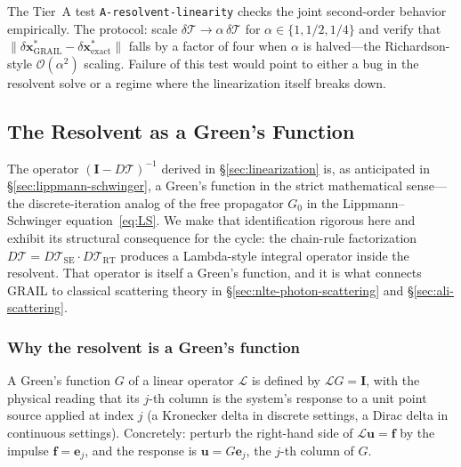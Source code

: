 \documentclass[11pt]{article}
\newcommand{\Tcyc}{\mathcal{T}}
\newcommand{\Trt}{\Tcyc_{\mathrm{RT}}}
\newcommand{\Tse}{\Tcyc_{\mathrm{SE}}}
\newcommand{\dT}{\delta\Tcyc}
\begin{document}
The Tier~A test \texttt{A-resolvent-linearity} checks the joint
second-order behavior empirically.  The protocol: scale $\dT \to
\alpha\,\dT$ for $\alpha \in \{1, 1/2, 1/4\}$ and verify that
$\|\delta\mathbf{x}^{*}_{\text{GRAIL}} -
\delta\mathbf{x}^{*}_{\text{exact}}\|$ falls by a factor of four when
$\alpha$ is halved---the Richardson-style $\mathcal{O}(\alpha^2)$
scaling.  Failure of this test would point to either a bug in the
resolvent solve or a regime where the linearization itself breaks
down.

\subsection{The Resolvent as a Green's Function}
\label{sec:resolvent-greens-function}

The operator $(\mathbf{I} - D\Tcyc)^{-1}$ derived in
\S\ref{sec:linearization} is, as anticipated in
\S\ref{sec:lippmann-schwinger}, a Green's function in the strict
mathematical sense---the discrete-iteration analog of the free
propagator $G_0$ in the Lippmann--Schwinger equation~\eqref{eq:LS}.
We make that identification rigorous here and exhibit its structural
consequence for the cycle: the chain-rule factorization $D\Tcyc =
D\Tse \cdot D\Trt$ produces a Lambda-style integral operator inside
the resolvent.  That operator is itself a Green's function, and it is
what connects GRAIL to classical scattering theory in
\S\ref{sec:nlte-photon-scattering} and \S\ref{sec:ali-scattering}.

\subsubsection{Why the resolvent is a Green's function}
\label{sec:why-greens}

A Green's function $G$ of a linear operator $\mathcal{L}$ is defined by
$\mathcal{L} G = \mathbf{I}$, with the physical reading that its
$j$-th column is the system's response to a unit point source applied
at index $j$ (a Kronecker delta in discrete settings, a Dirac delta in
continuous settings).  Concretely: perturb the right-hand side of
$\mathcal{L} \mathbf{u} = \mathbf{f}$ by the impulse $\mathbf{f} =
\mathbf{e}_j$, and the response is $\mathbf{u} = G \mathbf{e}_j$, the
$j$-th column of $G$.
\end{document}
